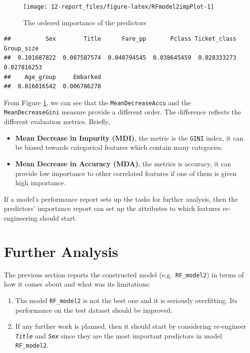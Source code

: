 \documentclass[
]{book}
\begin{document}
\begin{figure}

{\centering \texttt{[image: 12-report\_files/figure-latex/RFmodel2impPlot-1]} 

}

\caption{The ordered importance of the predictors}\label{fig:RFmodel2impPlot}
\end{figure}

\begin{verbatim}
##          Sex        Title      Fare_pp       Pclass Ticket_class   Group_size 
##  0.101687822  0.087587574  0.040794545  0.038645459  0.028333273  0.027816253 
##    Age_group     Embarked 
##  0.016016542  0.006786278
\end{verbatim}

From Figure \ref{fig:RFmodel2impPlot}, we can see that the \texttt{MeanDecreaseAccu} and the \texttt{MeanDecreaseGini} measure provide a different order. The difference reflects the different evaluation metrics. Briefly,

\begin{itemize}
\item
  \textbf{Mean Decrease in Impurity (MDI)}, the metric is the \texttt{GINI} index, it can be biased towards categorical features which contain many categories.
\item
  \textbf{Mean Decrease in Accuracy (MDA)}, the metrics is accuracy, it can provide low importance to other correlated features if one of them is given high importance.
\end{itemize}

If a model's performance report sets up the tasks for further analysis, then the predictors' importance report can set up the attributes to which features re-engineering should start.

\hypertarget{further-analysis}{%
\section{Further Analysis}\label{further-analysis}}

The previous section reports the constructed model (e.g.~\texttt{RF\_model2}) in terms of how it comes about and what was its limitations:

\begin{enumerate}
\def\labelenumi{\arabic{enumi}.}
\item
  The model \texttt{RF\_model2} is not the best one and it is seriously overfitting. Its performance on the test dataset should be improved.
\item
  If any further work is planned, then it should start by considering re-engineer \emph{\texttt{Title}} and \emph{\texttt{Sex}} since they are the most important predictors in model \texttt{RF\_model2}.
\end{enumerate}
\end{document}
